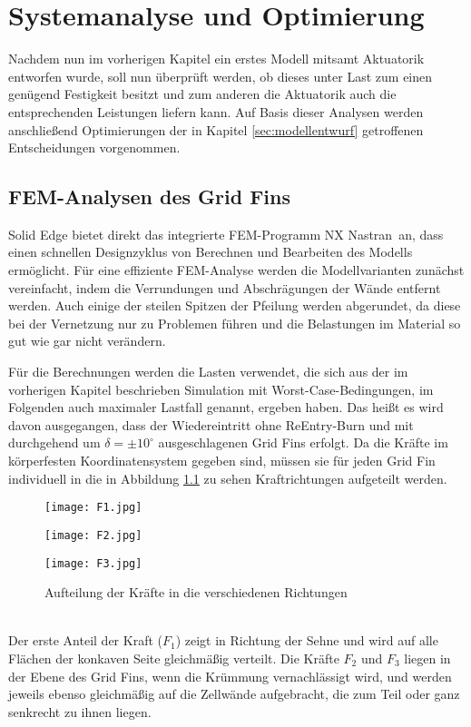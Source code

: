 \chapter{Systemanalyse und Optimierung}\label{sec:simulation}
Nachdem nun im vorherigen Kapitel ein erstes Modell mitsamt Aktuatorik entworfen wurde, soll nun überprüft werden, ob dieses unter Last zum einen genügend Festigkeit besitzt und zum anderen die Aktuatorik auch die entsprechenden Leistungen liefern kann. Auf Basis dieser Analysen werden anschließend Optimierungen der in Kapitel \ref{sec:modellentwurf} getroffenen Entscheidungen vorgenommen.


\section{FEM-Analysen des Grid Fins}
Solid Edge bietet direkt das integrierte FEM-Programm \grqq NX Nastran\grqq \ an, dass einen schnellen Designzyklus von Berechnen und Bearbeiten des Modells ermöglicht. Für eine effiziente FEM-Analyse werden die Modellvarianten zunächst vereinfacht, indem die Verrundungen und Abschrägungen der Wände entfernt werden. Auch einige der steilen Spitzen der Pfeilung werden abgerundet, da diese bei der Vernetzung nur zu Problemen führen und die Belastungen im Material so gut wie gar nicht verändern.

Für die Berechnungen werden die Lasten verwendet, die sich aus der im vorherigen Kapitel beschrieben Simulation mit Worst-Case-Bedingungen, im Folgenden auch maximaler Lastfall genannt, ergeben haben. Das heißt es wird davon ausgegangen, dass der Wiedereintritt ohne ReEntry-Burn und mit durchgehend um $\delta = \pm 10^\circ$ ausgeschlagenen Grid Fins erfolgt. Da die Kräfte im körperfesten Koordinatensystem gegeben sind, müssen sie für jeden Grid Fin individuell in die in Abbildung \ref{abb_Fs} zu sehen Kraftrichtungen aufgeteilt werden.
\begin{figure}[h]
	\begin{minipage}[t]{0.3\linewidth}
		\centering
		\texttt{[image: F1.jpg]}
	\end{minipage}
	\hfill
	\begin{minipage}[t]{0.3\linewidth}
		\centering
		\texttt{[image: F2.jpg]}
	\end{minipage}
	\hfill
	\begin{minipage}[t]{0.3\linewidth}
		\centering
		\texttt{[image: F3.jpg]}
	\end{minipage}
	\caption{Aufteilung der Kräfte in die verschiedenen Richtungen}
	\label{abb_Fs}
\end{figure}\\
Der erste Anteil der Kraft ($F_1$) zeigt in Richtung der Sehne und wird auf alle Flächen der konkaven Seite gleichmäßig verteilt. Die Kräfte $F_2$ und $F_3$ liegen in der Ebene des Grid Fins, wenn die Krümmung vernachlässigt wird, und werden jeweils ebenso gleichmäßig auf die Zellwände aufgebracht, die zum Teil oder ganz senkrecht zu ihnen liegen.

